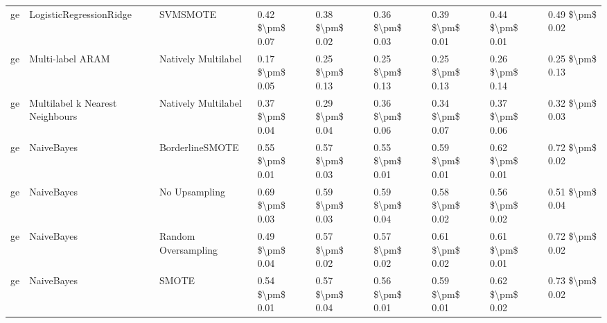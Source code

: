 \begin{tabular}{lllllllll}
      ge &         LogisticRegressionRidge &                      SVMSMOTE &     0.42 \$\textbackslash pm\$ 0.07 &           0.38 \$\textbackslash pm\$ 0.02 &       0.36 \$\textbackslash pm\$ 0.03 &        0.39 \$\textbackslash pm\$ 0.01 &                         0.44 \$\textbackslash pm\$ 0.01 &     0.49 \$\textbackslash pm\$ 0.02 \\
      ge &                Multi-label ARAM &           Natively Multilabel &     0.17 \$\textbackslash pm\$ 0.05 &           0.25 \$\textbackslash pm\$ 0.13 &       0.25 \$\textbackslash pm\$ 0.13 &        0.25 \$\textbackslash pm\$ 0.13 &                         0.26 \$\textbackslash pm\$ 0.14 &     0.25 \$\textbackslash pm\$ 0.13 \\
      ge & Multilabel k Nearest Neighbours &           Natively Multilabel &     0.37 \$\textbackslash pm\$ 0.04 &           0.29 \$\textbackslash pm\$ 0.04 &       0.36 \$\textbackslash pm\$ 0.06 &        0.34 \$\textbackslash pm\$ 0.07 &                         0.37 \$\textbackslash pm\$ 0.06 &     0.32 \$\textbackslash pm\$ 0.03 \\
      ge &                      NaiveBayes &               BorderlineSMOTE &     0.55 \$\textbackslash pm\$ 0.01 &           0.57 \$\textbackslash pm\$ 0.03 &       0.55 \$\textbackslash pm\$ 0.01 &        0.59 \$\textbackslash pm\$ 0.01 &                         0.62 \$\textbackslash pm\$ 0.01 &     0.72 \$\textbackslash pm\$ 0.02 \\
      ge &                      NaiveBayes &                 No Upsampling &     0.69 \$\textbackslash pm\$ 0.03 &           0.59 \$\textbackslash pm\$ 0.03 &       0.59 \$\textbackslash pm\$ 0.04 &        0.58 \$\textbackslash pm\$ 0.02 &                         0.56 \$\textbackslash pm\$ 0.02 &     0.51 \$\textbackslash pm\$ 0.04 \\
      ge &                      NaiveBayes &           Random Oversampling &     0.49 \$\textbackslash pm\$ 0.04 &           0.57 \$\textbackslash pm\$ 0.02 &       0.57 \$\textbackslash pm\$ 0.02 &        0.61 \$\textbackslash pm\$ 0.02 &                         0.61 \$\textbackslash pm\$ 0.01 &     0.72 \$\textbackslash pm\$ 0.02 \\
      ge &                      NaiveBayes &                         SMOTE &     0.54 \$\textbackslash pm\$ 0.01 &           0.57 \$\textbackslash pm\$ 0.04 &       0.56 \$\textbackslash pm\$ 0.01 &        0.59 \$\textbackslash pm\$ 0.01 &                         0.62 \$\textbackslash pm\$ 0.02 &     0.73 \$\textbackslash pm\$ 0.02 \\

\end{tabular}
